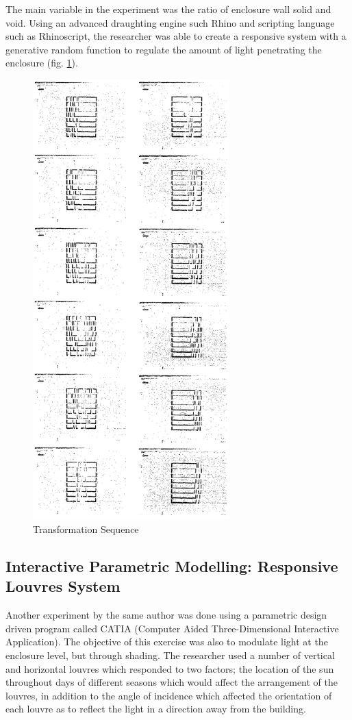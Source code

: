 The main variable in the experiment was the ratio of enclosure wall solid and void. Using an advanced draughting engine such Rhino and scripting language such as Rhinoscript, the researcher was able to create a responsive system with a generative random function to regulate the amount of light penetrating the enclosure (fig. \ref{fig:TransSeq}).


\begin{figure}[htbp]
\centering
\includegraphics[height=17cm]{./Images/2-TransfSequ}
\caption[Transformation Sequence of Enclosure]{Transformation Sequence \cite{zulas04}}
\label{fig:TransSeq}
\end{figure}

\subsection{Interactive Parametric Modelling: Responsive Louvres System}

Another experiment by the same author \cite{zulas04} was done using a parametric design driven program called CATIA (Computer Aided Three-Dimensional Interactive Application). The objective of this exercise was also to modulate light at the enclosure level, but through shading. The researcher used a number of vertical and horizontal louvres which responded to two factors; the location of the sun throughout days of different seasons which would affect the arrangement of the louvres, in addition to the angle of incidence which affected the orientation of each louvre as to reflect the light in a direction away from the building. 


